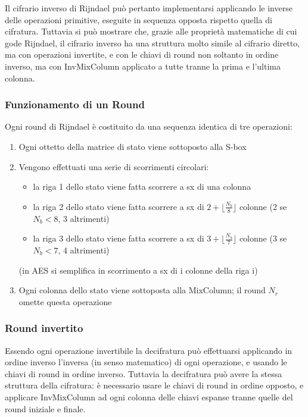 Il cifrario inverso di Rijndael può pertanto implementarsi applicando le inverse delle operazioni primitive, eseguite in sequenza opposta rispetto quella di cifratura. Tuttavia si può mostrare che, grazie alle proprietà matematiche di cui gode Rijndael, il cifrario inverso ha una struttura molto simile al cifrario diretto, ma con operazioni invertite, e con le chiavi di round non soltanto in ordine inverso, ma con InvMixColumn applicato a tutte tranne la prima e l'ultima colonna.

\subsubsection{Funzionamento di un Round}
Ogni round di Rijndael è costituito da una sequenza identica di tre operazioni:
\begin{enumerate}
  \item Ogni ottetto della matrice di stato viene sottoposto alla S-box
  \item Vengono effettuati una serie di scorrimenti circolari:
  		\begin{itemize}
  			\item la riga 1 dello stato viene fatta scorrere a sx di una colonna
  			\item la riga 2 dello stato viene fatta scorrere a sx di $2 + \lfloor \frac{N_{b}}{8} \rfloor$ colonne (2 se $N_{b} < 8$, 3 altrimenti)
  			\item la riga 3 dello stato viene fatta scorrere a sx di $3 + \lfloor \frac{N_{b}}{7} \rfloor$ colonne (3 se $N_{b} < 7$, 4 altrimenti)
		\end{itemize}
		(in AES si semplifica in scorrimento a sx di i colonne della riga i)
  \item Ogni colonna dello stato viene sottoposta alla MixColumn; il round $N_{r}$ omette questa operazione
\end{enumerate}

\subsubsection{Round invertito}
Essendo ogni operazione invertibile la decifratura può effettuarsi applicando in ordine inverso l'inversa (in senso matematico) di ogni operazione, e usando le chiavi di round in ordine inverso. Tuttavia la decifratura può avere la stessa struttura della cifratura: è necessario usare le chiavi di round in ordine opposto, e applicare InvMixColumn ad ogni colonna delle chiavi espanse tranne quelle del round iniziale e finale.

